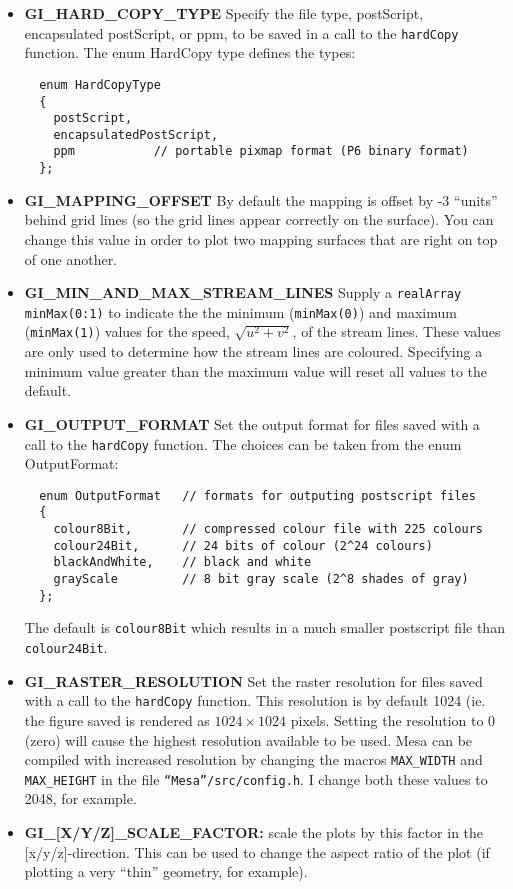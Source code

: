 \documentclass{article}
\begin{document}
\begin{itemize}
 \item{\bf GI\_HARD\_COPY\_TYPE} Specify the file type, postScript, encapsulated postScript,
      or ppm, to be saved in a call
    to the {\tt hardCopy} function. The enum HardCopy type defines the types:
\begin{verbatim}
  enum HardCopyType
  {
    postScript,
    encapsulatedPostScript,
    ppm           // portable pixmap format (P6 binary format)
  };
\end{verbatim}
 \item{\bf GI\_MAPPING\_OFFSET} By default the mapping is offset by -3 ``units'' behind
   grid lines (so the grid lines appear correctly on the surface). You can change this value
   in order to plot two mapping surfaces that are right on top of one another. 
 \item{\bf GI\_MIN\_AND\_MAX\_STREAM\_LINES} Supply a {\tt realArray minMax(0:1)} to
    indicate the the minimum ({\tt minMax(0)}) and maximum ({\tt minMax(1)}) values for the
    speed, $\sqrt{u^2+v^2}$, of the stream lines. These values are only used to determine
    how the stream lines are coloured. Specifying a minimum value greater than the maximum
    value will reset all values to the default.
 \item{\bf GI\_OUTPUT\_FORMAT} Set the output format for files saved with a call to the
   {\tt hardCopy} function. The choices can be taken from the enum OutputFormat:
\begin{verbatim}
  enum OutputFormat   // formats for outputing postscript files
  {
    colour8Bit,       // compressed colour file with 225 colours
    colour24Bit,      // 24 bits of colour (2^24 colours)
    blackAndWhite,    // black and white
    grayScale         // 8 bit gray scale (2^8 shades of gray)
  };
\end{verbatim}
   The default is {\tt colour8Bit} which results in a much smaller postscript file than {\tt colour24Bit}.
 \item{\bf GI\_RASTER\_RESOLUTION} Set the raster resolution for files saved with a call to the
   {\tt hardCopy} function. This resolution is by default 1024 (ie. the figure saved is
   rendered as $1024\times 1024$ pixels. Setting the resolution to 0 (zero) will cause the highest
   resolution available to be used. Mesa can be compiled with increased resolution by changing 
   the macros {\tt MAX\_WIDTH} and {\tt MAX\_HEIGHT} in the file {\tt ``Mesa''/src/config.h}.
   I change both these values to 2048, for example.
 \item{\bf GI\_[X/Y/Z]\_SCALE\_FACTOR:} scale the plots by this factor in the [x/y/z]-direction. This can be used
   to change the aspect ratio of the plot (if plotting a very ``thin'' geometry, for example).
\end{itemize}
\end{document}
